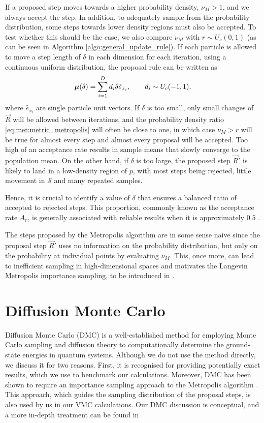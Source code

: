If a proposed step moves towards a higher probability density, $\nu_{M} > 1$, and we always accept the step. In addition, to adequately sample from the probability distribution, some steps towards lower density regions must also be accepted. To test whether this should be the case, we also compare $\nu_M$ with $r \sim U_c (0,1)$ (as can be seen in Algorithm \ref{algo:general_update_rule}). If each particle is allowed to move a step length of $\delta$ in each dimension for each iteration, using a continuous uniform distribution, the proposal rule can be written as
\begin{align}
    \mvec{\mu}(\delta) = \sum_{i=1}^{D} d_i \delta \hat{e}_{x_{i}}, \hspace{20px} d_i \sim U_c (-1, 1), \label{eq:met:update_rule_metropolis}
\end{align}
where $\hat{e}_{x_{i}}$ are single particle unit vectors. If $\delta$ is too small, only small changes of $\Vec{R}$ will be allowed between iterations, and the probability density ratio \eqref{eq:met:metric_metropolis} will often be close to one, in which case $\nu_{M} > r$ will be true for almost every step and almost every proposal will be accepted. Too high of an acceptance rate results in sample means that slowly converge to the population mean. On the other hand, if $\delta$ is too large, the proposed step $\Vec{R}'$ is likely to land in a low-density region of $p$, with most steps being rejected, little movement in $\mathcal{S}$ and many repeated samples. 

Hence, it is crucial to identify a value of $\delta$ that ensures a balanced ratio of accepted to rejected steps. This proportion, commonly known as the acceptance rate $A_r$, is generally associated with reliable results when it is approximately $0.5$ \cite{gelmanWeakConvergenceOptimal1997}.

The steps proposed by the Metropolis algorithm are in some sense naive since the proposal step $\Vec{R}'$ uses no information on the probability distribution, but only on the probability at individual points by evaluating $\nu_M$. This, once more, can lead to inefficient sampling in high-dimensional spaces and motivates the Langevin Metropolis importance sampling, to be introduced in .

\section{Diffusion Monte Carlo}

Diffusion Monte Carlo (DMC) is a well-established method for employing Monte Carlo sampling and diffusion theory to computationally determine the ground-state energies in quantum systems. Although we do not use the method directly, we discuss it for two reasons. First, it is recognised for providing potentially exact results, which we use to benchmark our calculations. Moreover, DMC has been shown to require an importance sampling approach to the Metropolis algorithm \cite{kalos1974helium}. This approach, which guides the sampling distribution of the proposal steps, is also used by us in our VMC calculations. Our DMC discussion is conceptual, and a more in-depth treatment can be found in \cite{Apaja2018qmc, kosztin1996introduction}

